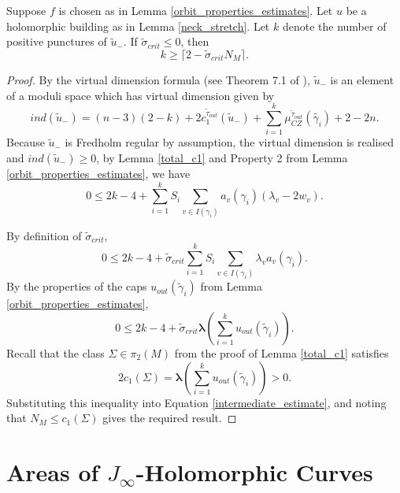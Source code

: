 \documentclass{article}
\numberwithin{equation}{section}
\numberwithin{figure}{section}
\begin{document}
\begin{lem}
\label{k_estimate}
Suppose $f$ is chosen as in Lemma \ref{orbit_properties_estimates}. Let $u$ be a holomorphic building as in Lemma \ref{neck_stretch}. Let $k$ denote the number of positive punctures of $\tilde{u}_-$.
If $\tilde{\sigma}_{crit}\leq 0$, then
\begin{equation}
    k\geq \lceil 2-\tilde{\sigma}_{crit}N_M\rceil.
\end{equation}
\end{lem}
\begin{proof}
By the virtual dimension formula  (see Theorem 7.1 of \cite{Wendl}), $\tilde{u}_-$ is an element of a moduli space which has virtual dimension given by 
\begin{equation}
ind(\tilde{u}_-)=(n-3)(2-k)+2c_1^{\tilde{\tau}_{out}}(\tilde{u}_-)+\sum_{i=1}^{k}\mu_{CZ}^{\tilde{\tau}_{out}}(\tilde{\gamma_i})+2-2n.
\end{equation}
Because $\tilde{u}_-$ is Fredholm regular by assumption, the virtual dimension is realised and $ind(\tilde{u}_-)\geq 0$, 
by Lemma \ref{total_c1} and Property 2 from Lemma \ref{orbit_properties_estimates}, we have 
\begin{equation}
0\leq 2k-4+\sum_{i=1}^kS_i\sum_{v\in I(\gamma_i)}a_v(\gamma_i)(\lambda_v-2w_v).
\end{equation}

By definition of $\tilde{\sigma}_{crit}$,
\begin{equation}
0\leq 2k-4+\tilde{\sigma}_{crit}\sum_{i=1}^{k}S_i\sum_{v\in I(\gamma_i)}\lambda_v a_v(\gamma_i).
\end{equation}
By the properties of the caps $u_{out}(\tilde{\gamma}_i)$ from Lemma \ref{orbit_properties_estimates},
\begin{equation}
\label{intermediate_estimate}
0\leq 2k-4+\tilde{\sigma}_{crit}\pmb{\lambda}\left(\sum_{i=1}^ku_{out}(\tilde{\gamma}_i)\right).
\end{equation}
Recall that the class $\Sigma\in \pi_2(M)$ from the proof of Lemma \ref{total_c1} satisfies \begin{equation}
2c_1(\Sigma)=\pmb{\lambda}\left(\sum_{i=1}^ku_{out}(\tilde{\gamma}_i)\right)>0.
\end{equation}
Substituting this inequality into Equation \ref{intermediate_estimate}, and noting that $N_M\leq c_1(\Sigma)$ gives the required result.
\end{proof}

\section{Areas of $J_\infty$-Holomorphic Curves}
\end{document}
